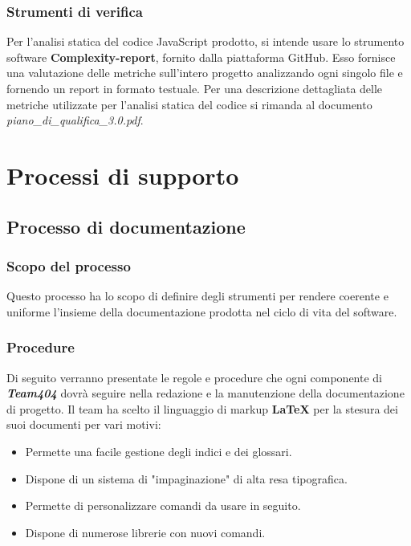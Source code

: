 \documentclass[a4paper,11pt]{article}
\begin{document}
\subsubsection{Strumenti di verifica}

Per l'analisi statica del codice JavaScript prodotto, si intende usare lo strumento software \textbf{Complexity-report\addglos}, fornito dalla piattaforma GitHub.
Esso fornisce una valutazione delle metriche sull'intero progetto analizzando ogni singolo file e fornendo un report in formato testuale.
Per una descrizione dettagliata delle metriche utilizzate per l'analisi statica del codice si rimanda al documento \textit{piano\_di\_qualifica\_3.0.pdf}.
		
	\section{Processi di supporto}
		\subsection{Processo di documentazione}
		
			\subsubsection{Scopo del processo}
			Questo processo ha lo scopo di definire degli strumenti per rendere coerente e uniforme l'insieme della documentazione prodotta nel ciclo di vita del software.
			
			\subsubsection{Procedure}
			Di seguito verranno presentate le regole e procedure che ogni componente di \textbf{\emph{Team404}} dovrà seguire nella redazione e la manutenzione  della documentazione di progetto. Il team ha scelto il linguaggio di markup \textbf{\LaTeX} per la  stesura dei suoi documenti per vari motivi:
			\begin{itemize}
			\item Permette una facile gestione degli indici e dei glossari.
			\item Dispone di  un sistema di "impaginazione" di alta resa tipografica.
			\item Permette di personalizzare comandi da usare in seguito.
			\item Dispone di numerose librerie con nuovi comandi.
	\end{itemize}		 
\end{document}
